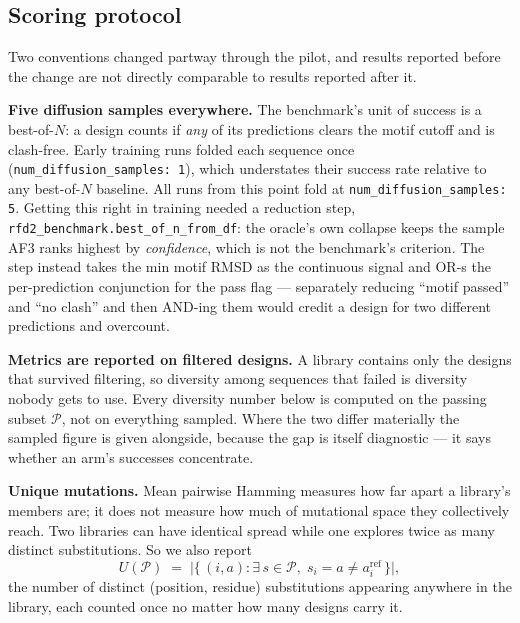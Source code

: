 
\subsection*{Scoring protocol}

Two conventions changed partway through the pilot, and results reported before
the change are not directly comparable to results reported after it.

\textbf{Five diffusion samples everywhere.} The benchmark's unit of success is
a best-of-$N$: a design counts if \emph{any} of its predictions clears the motif
cutoff and is clash-free. Early training runs folded each sequence once
(\texttt{num\_diffusion\_samples: 1}), which understates their success rate
relative to any best-of-$N$ baseline. All runs from this point fold at
\texttt{num\_diffusion\_samples: 5}. Getting this right in training needed a
reduction step, \texttt{rfd2\_benchmark.best\_of\_n\_from\_df}: the oracle's own
collapse keeps the sample AF3 ranks highest by \emph{confidence}, which is not
the benchmark's criterion. The step instead takes the min motif RMSD as the
continuous signal and OR-s the per-prediction conjunction for the pass flag ---
separately reducing ``motif passed'' and ``no clash'' and then AND-ing them
would credit a design for two different predictions and overcount.

\textbf{Metrics are reported on filtered designs.} A library contains only the
designs that survived filtering, so diversity among sequences that failed is
diversity nobody gets to use. Every diversity number below is computed on the
passing subset $\mathcal{P}$, not on everything sampled. Where the two differ
materially the sampled figure is given alongside, because the gap is itself
diagnostic --- it says whether an arm's successes concentrate.

\textbf{Unique mutations.} Mean pairwise Hamming measures how far apart a
library's members are; it does not measure how much of mutational space they
collectively reach. Two libraries can have identical spread while one explores
twice as many distinct substitutions. So we also report
\[
  U(\mathcal{P}) \;=\; \bigl|\{\, (i, a) : \exists\, s \in \mathcal{P},\;
  s_i = a \neq a^{\mathrm{ref}}_i \,\}\bigr|,
\]
the number of distinct (position, residue) substitutions appearing anywhere in
the library, each counted once no matter how many designs carry it.

